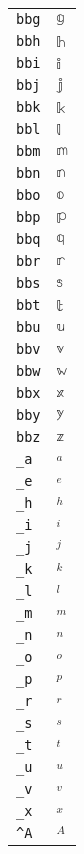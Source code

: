 \begin{longtable}{ll}
\texttt{bbg}&${}{\mathbb{g}}{}$\\
\texttt{bbh}&${}{\mathbb{h}}{}$\\
\texttt{bbi}&${}{\mathbb{i}}{}$\\
\texttt{bbj}&${}{\mathbb{j}}{}$\\
\texttt{bbk}&${}{\mathbb{k}}{}$\\
\texttt{bbl}&${}{\mathbb{l}}{}$\\
\texttt{bbm}&${}{\mathbb{m}}{}$\\
\texttt{bbn}&${}{\mathbb{n}}{}$\\
\texttt{bbo}&${}{\mathbb{o}}{}$\\
\texttt{bbp}&${}{\mathbb{p}}{}$\\
\texttt{bbq}&${}{\mathbb{q}}{}$\\
\texttt{bbr}&${}{\mathbb{r}}{}$\\
\texttt{bbs}&${}{\mathbb{s}}{}$\\
\texttt{bbt}&${}{\mathbb{t}}{}$\\
\texttt{bbu}&${}{\mathbb{u}}{}$\\
\texttt{bbv}&${}{\mathbb{v}}{}$\\
\texttt{bbw}&${}{\mathbb{w}}{}$\\
\texttt{bbx}&${}{\mathbb{x}}{}$\\
\texttt{bby}&${}{\mathbb{y}}{}$\\
\texttt{bbz}&${}{\mathbb{z}}{}$\\
\texttt{\_a}&${}_a{}$\\
\texttt{\_e}&${}_e{}$\\
\texttt{\_h}&${}_h{}$\\
\texttt{\_i}&${}_i{}$\\
\texttt{\_j}&${}_j{}$\\
\texttt{\_k}&${}_k{}$\\
\texttt{\_l}&${}_l{}$\\
\texttt{\_m}&${}_m{}$\\
\texttt{\_n}&${}_n{}$\\
\texttt{\_o}&${}_o{}$\\
\texttt{\_p}&${}_p{}$\\
\texttt{\_r}&${}_r{}$\\
\texttt{\_s}&${}_s{}$\\
\texttt{\_t}&${}_t{}$\\
\texttt{\_u}&${}_u{}$\\
\texttt{\_v}&${}_v{}$\\
\texttt{\_x}&${}_x{}$\\
\texttt{\textasciicircum A}&${}^A{}$\\

\end{longtable}
